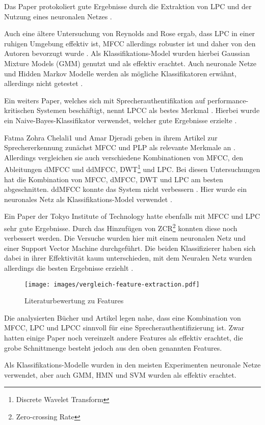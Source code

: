 Das Paper  protokoliert gute Ergebnisse durch die Extraktion von \ac{LPC} und der Nutzung eines neuronalen Netzes \autocite[vgl.][S. 9]{kumar_rajeev_multilingual_2009}.

Auch eine ältere Untersuchung von Reynolds and Rose ergab, dass \ac{LPC} in einer ruhigen Umgebung effektiv ist, \ac{MFCC} allerdings robuster ist und daher von den Autoren bevorzugt wurde \autocite[vgl.][S. 2f]{reynolds_robust_1995}.
Als Klassifikations-Model wurden hierbei Gaussian Mixture Models (GMM) genutzt und als effektiv erachtet.
Auch neuronale Netze und Hidden Markov Modelle werden als mögliche Klassifikatoren erwähnt, allerdings nicht getestet \autocite[vgl.][S. 2f, 11]{reynolds_robust_1995}.

Ein weiters Paper, welches sich mit Sprecherauthentifikation auf performance-kritischen Systemen beschäftigt, nennt \ac{LPCC} als bestes Merkmal \autocite[vgl.][S. 7]{thullier_text-independent_2017}.
Hierbei wurde ein Naive-Bayes-Klassifikator verwendet, welcher gute Ergebnisse erzielte \autocite[vgl.][S. 18f]{thullier_text-independent_2017}.

Fatma Zohra Chelali1 und Amar Djeradi geben in ihrem Artikel zur Sprechererkennung zunächst \ac{MFCC} und PLP als relevante Merkmale an \autocite[vgl.][S. 276]{chelali_text_2017}.
Allerdings vergleichen sie auch verschiedene Kombinationen von \ac{MFCC}, den Ableitungen \ac{dMFCC} und \ac{ddMFCC}, DWT\footnote{Discrete Wavelet Transform} und \ac{LPC}.
Bei diesen Untersuchungen hat die Kombination von \ac{MFCC}, \ac{dMFCC}, DWT und \ac{LPC} am besten abgeschnitten.
\ac{ddMFCC} konnte das System nicht verbessern \autocite[vgl.][S. 276, 739]{chelali_text_2017}.
Hier wurde ein neuronales Netz als Klassifikations-Model verwendet \autocite[vgl.][S. 735]{chelali_text_2017}.

Ein Paper der Tokyo Institute of Technology hatte ebenfalls mit \ac{MFCC} und \ac{LPC} sehr gute Ergebnisse.
Durch das Hinzufügen von ZCR\footnote{Zero-crossing Rate} konnten diese noch verbessert werden.
Die Versuche wurden hier mit einem neuronalen Netz und einer Support Vector Machine durchgeführt.
Die beiden Klassifizierer haben sich dabei in ihrer Effektivität kaum unterschieden, mit dem Neuralen Netz wurden allerdings die besten Ergebnisse erziehlt \autocite[vgl.][S. 4]{neha_chauhan_2019_2019}.

\begin{figure}[H]
    \centering
    \texttt{[image: images/vergleich-feature-extraction.pdf]}
    \caption{Literaturbewertung zu Features}
    \label{fig:vergleichFeatureExtraction}
\end{figure}

Die analysierten Bücher und Artikel legen nahe, dass eine Kombination von \ac{MFCC}, \ac{LPC} und \ac{LPCC} sinnvoll für eine Sprecherauthentifizierung ist.
Zwar hatten einige Paper noch vereinzelt andere Features als effektiv erachtet, die grobe Schnittmenge besteht jedoch aus den oben genannten Features.

Als Klassifikations-Modelle wurden in den meisten Experimenten neuronale Netze verwendet, aber auch GMM, HMN und SVM wurden als effektiv erachtet.